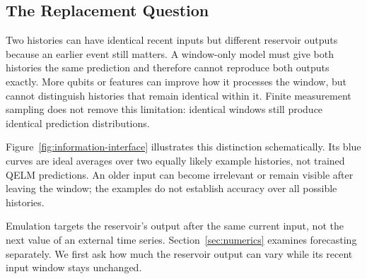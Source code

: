 \subsection{The Replacement Question}

Two histories can have identical recent inputs but different reservoir
outputs because an earlier event still matters. A window-only model must
give both histories the same prediction and therefore cannot reproduce
both outputs exactly. More qubits or features can improve how it processes
the window, but cannot distinguish histories that remain identical within
it. Finite measurement sampling does not remove this limitation: identical
windows still produce identical prediction distributions.

Figure~\ref{fig:information-interface} illustrates this distinction
schematically. Its blue curves are ideal averages over two equally likely
example histories, not trained QELM predictions. An older input can become
irrelevant or remain visible after leaving the window; the examples do not
establish accuracy over all possible histories.

Emulation targets the reservoir's output after the same current input,
not the next value of an external time series. Section~\ref{sec:numerics}
examines forecasting separately. We first ask how much the reservoir output
can vary while its recent input window stays unchanged.
